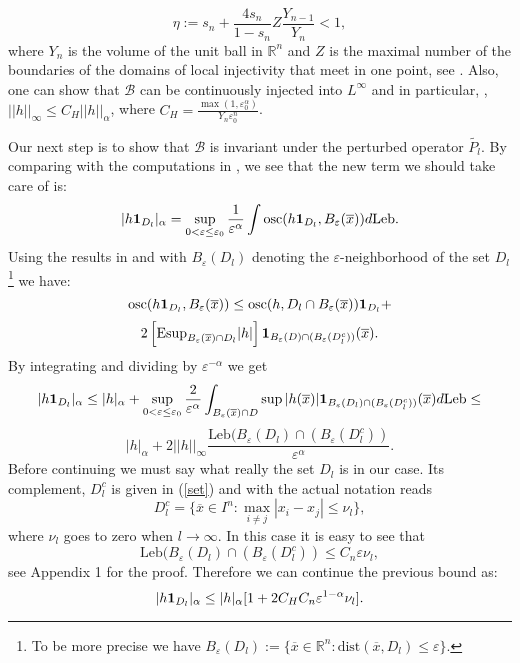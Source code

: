 \documentclass[12pt,reqno,a4paper]{amsart}
\let\epsilon\varepsilon
\let\tilde\widetilde
\def\Le{\text{Leb}}
\def\a{\alpha}
\def\eps{\varepsilon}
\def\ox{\overline{x}}
\def\eps {\varepsilon}
\begin{document}
  \begin{equation}\label{ETA2}
\eta:=s_n+\frac{4s_n}{1-s_n}Z\frac{Y_{n-1}}{Y_n}<1,
\end{equation}
where $Y_n$ is the volume of the unit ball in $\mathbb{R}^n$ and $Z$ is the maximal number of the boundaries of the domains of local injectivity that  meet in one point, see \cite{S}.  Also, one can show that $\mathcal{B}$ can be continuously  injected into $L^{\infty}$ and in particular, \cite{S}, $||h||_{\infty}\le C_H ||h||_{\a}$, where $C_H=\frac{\max(1,\eps_0^{\a})}{Y_n \eps_0^n}$.

Our next step is to show that $\mathcal{B}$ is invariant under the perturbed operator $\tilde{P_l}$. By comparing with the computations in \cite{S}, we see that the new term we should take care of is:
$$
|h{\bf 1}_{D_l}|_{\a}=\sup_{0<\eps\le \eps_0}\frac{1}{\eps^{\a}}\int \text{osc}(h{\bf 1}_{D_l}, B_{\eps}(\ox)) d\Le.
$$
Using the results in \cite{S} and with $B_{\eps}(D_l)$ denoting the $\epsilon$-neighborhood of the set $D_l$\footnote{To be more precise we have $B_{\eps}(D_l):=\{\ox\in \mathbb{R}^n: \text{dist}(\ox, D_l)\le \eps\}.$} we have:
            $$
            \text{osc}(h{\bf 1}_{D_l}, B_{\eps}(\ox))\le \text{osc}(h, D_l\cap B_{\eps}(\ox)){\bf 1}_{D_l}+
            $$
            $$
            2 \left[ \text{Esup}_{B_{\eps}(\ox)\cap D_l}|h|\right]{\bf 1}_{ B_{\eps}(D)\cap (B_{\eps}(D_l^c))}(\ox).
            $$
            By integrating and dividing by $\eps^{-\a}$ we get
            $$
            |h{\bf 1}_{D_l}|_{\a}\le |h|_{\a}+\sup_{0<\eps\le \eps_0}\frac{2}{\eps^{\a}}\int_{B_{\eps}(\ox)\cap D}\sup|h(\ox)|{\bf 1}_{ B_{\eps}(D_l)\cap (B_{\eps}(D_l^c))}(\ox)d\Le \le$$
            $$
            |h|_{\a}+2||h||_{\infty}\frac{\Le( B_{\eps}(D_l)\cap (B_{\eps}(D_l^c))}{\eps^{\a}}.
            $$
            Before continuing we must say what really the set $D_l$ is in our case. Its complement, $D_l^c$ is given in (\ref{set}) and with the actual notation reads
            $$
            D_l^c=\{\ox\in I^n: \max_{i\neq j}|x_i-x_j|\le \nu_l\},
            $$
            where $\nu_l$ goes to zero when $l\rightarrow \infty.$ In this case it is easy to see that
            \begin{equation}\label{EDC}
            \Le( B_{\eps}(D_l)\cap (B_{\eps}(D_l^c))\le C_n\eps \nu_l,
             \end{equation}
             see Appendix 1 for the proof. Therefore we can continue the previous bound as:
            $$
             |h{\bf 1}_{D_l}|_{\a}\le  |h|_{\a}[1+2C_H C_n\eps^{1-\alpha}\nu_l ].
            $$
\end{document}
